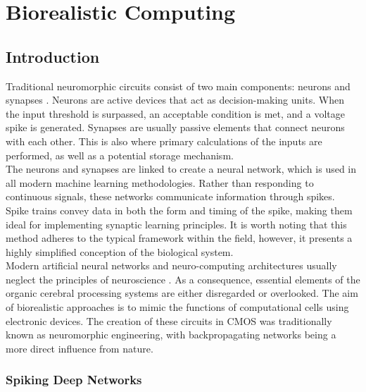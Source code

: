 \chapter{Biorealistic Computing}

\section[Introduction]{Introduction}

Traditional neuromorphic circuits consist of two main components: neurons and synapses \cite{mead1989analog}. Neurons are active devices that act as decision-making units. When the input threshold is surpassed, an acceptable condition is met, and a voltage spike is generated. Synapses are usually passive elements that connect neurons with each other. This is also where primary calculations of the inputs are performed, as well as a potential storage mechanism.\\

\noindent The neurons and synapses are linked to create a neural network, which is used in all modern machine learning methodologies. Rather than responding to continuous signals, these networks communicate information through spikes. Spike trains convey data in both the form and timing of the spike, making them ideal for implementing synaptic learning principles. It is worth noting that this method adheres to the typical framework within the field, however, it presents a highly simplified conception of the biological system.\\

\noindent Modern artificial neural networks and neuro-computing architectures usually neglect the principles of neuroscience \cite{pfeiffer2018deep}. As a consequence, essential elements of the organic cerebral processing systems are either disregarded or overlooked. The aim of biorealistic approaches is to mimic the functions of computational cells using electronic devices. The creation of these circuits in CMOS was traditionally known as neuromorphic engineering, with backpropagating networks being a more direct influence from nature.

\subsection[Spiking Deep Networks]{Spiking Deep Networks}

